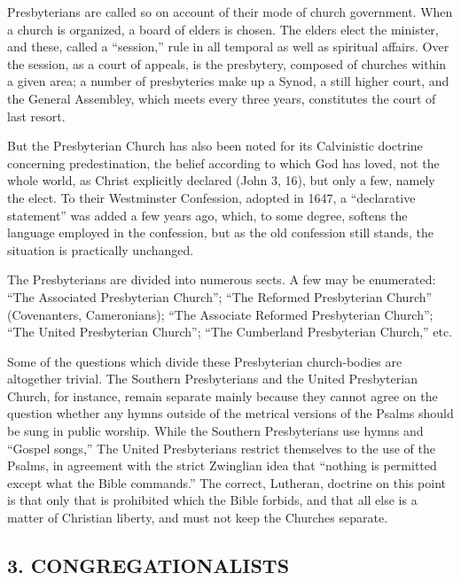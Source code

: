 \documentclass[
]{book}
\begin{document}
Presbyterians are called so on account of their mode of church government. When a church is organized, a board of elders is chosen. The elders elect the minister, and these, called a ``session,'' rule in all temporal as well as spiritual affairs. Over the session, as a court of appeals, is the presbytery, composed of churches within a given area; a number of presbyteries make up a Synod, a still higher court, and the General Assembley, which meets every three years, constitutes the court of last resort.

But the Presbyterian Church has also been noted for its Calvinistic doctrine concerning predestination, the belief according to which God has loved, not the whole world, as Christ explicitly declared (John 3, 16), but only a few, namely the elect. To their Westminster Confession, adopted in 1647, a ``declarative statement'' was added a few years ago, which, to some degree, softens the language employed in the confession, but as the old confession still stands, the situation is practically unchanged.

The Presbyterians are divided into numerous sects. A few may be enumerated: ``The Associated Presbyterian Church''; ``The Reformed Presbyterian Church'' (Covenanters, Cameronians); ``The Associate Reformed Presbyterian Church''; ``The United Presbyterian Church''; ``The Cumberland Presbyterian Church,'' etc.

Some of the questions which divide these Presbyterian church-bodies are altogether trivial. The Southern Presbyterians and the United Presbyterian Church, for instance, remain separate mainly because they cannot agree on the question whether any hymns outside of the metrical versions of the Psalms should be sung in public worship. While the Southern Presbyterians use hymns and ``Gospel songs,'' The United Presbyterians restrict themselves to the use of the Psalms, in agreement with the strict Zwinglian idea that ``nothing is permitted except what the Bible commands.'' The correct, Lutheran, doctrine on this point is that only that is prohibited which the Bible forbids, and that all else is a matter of Christian liberty, and must not keep the Churches separate.

\subsection*{\texorpdfstring{3. CONGREGATIONALISTS}{3. CONGREGATIONALISTS}}\label{congregationalists}
\end{document}
